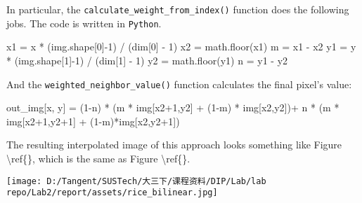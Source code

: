 \documentclass[
]{article}
\newenvironment{Shaded}{}{}
\newcommand{\DecValTok}[1]{\textcolor[rgb]{0.25,0.63,0.44}{#1}}
\newcommand{\NormalTok}[1]{#1}
\newcommand{\OperatorTok}[1]{\textcolor[rgb]{0.40,0.40,0.40}{#1}}
\begin{document}
In particular, the \texttt{calculate\_weight\_from\_index()} function
does the following jobs. The code is written in \texttt{Python}.

\begin{Shaded}
\begin{Highlighting}[]
\NormalTok{x1 }\OperatorTok{=}\NormalTok{ x }\OperatorTok{*}\NormalTok{ (img.shape[}\DecValTok{0}\NormalTok{]}\OperatorTok{{-}}\DecValTok{1}\NormalTok{) }\OperatorTok{/}\NormalTok{ (dim[}\DecValTok{0}\NormalTok{] }\OperatorTok{{-}} \DecValTok{1}\NormalTok{)}
\NormalTok{x2 }\OperatorTok{=}\NormalTok{ math.floor(x1)}
\NormalTok{m }\OperatorTok{=}\NormalTok{ x1 }\OperatorTok{{-}}\NormalTok{ x2}
\NormalTok{y1 }\OperatorTok{=}\NormalTok{ y }\OperatorTok{*}\NormalTok{ (img.shape[}\DecValTok{1}\NormalTok{]}\OperatorTok{{-}}\DecValTok{1}\NormalTok{) }\OperatorTok{/}\NormalTok{ (dim[}\DecValTok{1}\NormalTok{] }\OperatorTok{{-}} \DecValTok{1}\NormalTok{)}
\NormalTok{y2 }\OperatorTok{=}\NormalTok{ math.floor(y1)}
\NormalTok{n }\OperatorTok{=}\NormalTok{ y1 }\OperatorTok{{-}}\NormalTok{ y2}
\end{Highlighting}
\end{Shaded}

And the \texttt{weighted\_neighbor\_value()} function calculates the
final pixel's value:

\begin{Shaded}
\begin{Highlighting}[]
\NormalTok{out\_img[x, y] }\OperatorTok{=}\NormalTok{ (}\DecValTok{1}\OperatorTok{{-}}\NormalTok{n) }\OperatorTok{*}\NormalTok{ (m }\OperatorTok{*}\NormalTok{ img[x2}\OperatorTok{+}\DecValTok{1}\NormalTok{,y2] }\OperatorTok{+}\NormalTok{ (}\DecValTok{1}\OperatorTok{{-}}\NormalTok{m) }\OperatorTok{*}\NormalTok{ img[x2,y2])}\OperatorTok{+}\NormalTok{ n }\OperatorTok{*}\NormalTok{ (m }\OperatorTok{*}\NormalTok{ img[x2}\OperatorTok{+}\DecValTok{1}\NormalTok{,y2}\OperatorTok{+}\DecValTok{1}\NormalTok{] }\OperatorTok{+}\NormalTok{ (}\DecValTok{1}\OperatorTok{{-}}\NormalTok{m)}\OperatorTok{*}\NormalTok{img[x2,y2}\OperatorTok{+}\DecValTok{1}\NormalTok{])}
\end{Highlighting}
\end{Shaded}

The resulting interpolated image of this approach looks something like
Figure \textbackslash ref\{\}, which is the same as Figure
\textbackslash ref\{\}.

\texttt{[image: D:/Tangent/SUSTech/大三下/课程资料/DIP/Lab/lab repo/Lab2/report/assets/rice\_bilinear.jpg]}
\end{document}
